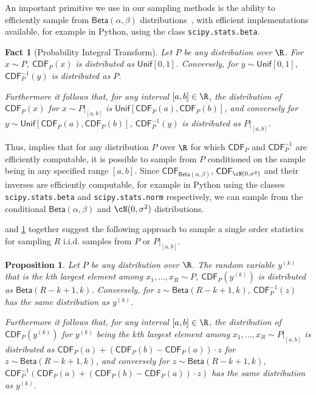 \documentclass[twoside]{article}
\newtheorem{proposition}[theorem]{Proposition}
\newtheorem{fact}[theorem]{Fact}
\theoremstyle{definition}
\newcommand{\CDF}{\mathsf{CDF}}
\newcommand{\Beta}{\mathsf{Beta}}
\newcommand{\Unif}{\mathsf{Unif}}
\begin{document}
An important primitive we use in our sampling methods is the ability to efficiently sample from $\Beta(\alpha, \beta)$ distributions~\citep[see, e.g.,][]{marsaglia00simple}, with efficient implementations available, for example in Python, using the class \texttt{scipy.stats.beta}.

\begin{fact}[Probability Integral Transform]\label{fact:prob-int-transform}
Let $P$ be any distribution over $\R$.
For $x \sim P$, $\CDF_P(x)$ is distributed as $\Unif[0, 1]$. Conversely, for $y \sim \Unif[0, 1]$, $\CDF_P^{-1}(y)$ is distributed as $P$.%

Furthermore it follows that, for any interval $[a, b] \in \R$, the distribution of $\CDF_P(x)$ for $x \sim P|_{[a, b]}$ is $\Unif[\CDF_P(a), \CDF_P(b)]$, and conversely for $y \sim \Unif[\CDF_P(a), \CDF_P(b)]$, $\CDF_P^{-1}(y)$ is distributed as $P|_{[a, b]}$.
\end{fact}

Thus,  implies that for any distribution $P$ over $\R$ for which $\CDF_P$ and $\CDF_P^{-1}$ are efficiently computable, it is possible to sample from $P$ conditioned on the sample being in any specified range $[a, b]$.
Since $\CDF_{\Beta(\alpha, \beta)}$, $\CDF_{\cN(0, \sigma^2)}$ and their inverses are efficiently computable, for example in Python using the classes \texttt{scipy.stats.beta} and \texttt{scipy.stats.norm} respectively, we can sample from the conditional $\Beta(\alpha, \beta)$ and $\cN(0, \sigma^2)$ distributions.

 and \ref{fact:prob-int-transform} together suggest the following approach to sample a single order statistics for sampling $R$ i.i.d. samples from $P$ or $P|_{[a, b]}$.
\begin{proposition}\label{prop:sample-single-order}
Let $P$ be any distribution over $\R$.
The random variable $y^{(k)}$ that is the $k$th largest element among $x_1, \ldots, x_R \sim P$, $\CDF_P(y^{(k)})$ is distributed as $\Beta(R-k+1, k)$. Conversely, for $z \sim \Beta(R-k+1, k)$, $\CDF_P^{-1}(z)$ has the same distribution as $y^{(k)}$.%

Furthermore it follows that, for any interval $[a, b] \in \R$, the distribution of $\CDF_P(y^{(k)})$ for $y^{(k)}$ being the $k$th largest element among $x_1, \ldots, x_R \sim P|_{[a, b]}$ is distributed as $\CDF_P(a) + (\CDF_P(b) - \CDF_P(a)) \cdot z$ for $z \sim \Beta(R-k+1, k)$, and conversely for $z \sim \Beta(R-k+1, k)$, $\CDF_P^{-1}(\CDF_P(a) + (\CDF_P(b) - \CDF_P(a)) \cdot z)$ has the same distribution as $y^{(k)}$.
\end{proposition}
\end{document}
